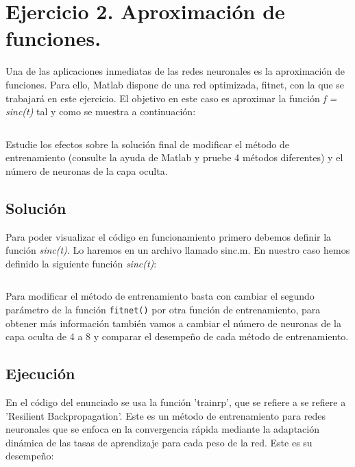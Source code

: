 \documentclass[a4paper, 12pt]{article}
\begin{document}
    
    \section{Ejercicio 2. Aproximación de funciones.}
    
        Una de las aplicaciones inmediatas de las redes neuronales es la aproximación de funciones. Para ello, Matlab dispone de una red optimizada, fitnet, con la que se trabajará en este ejercicio. El objetivo en este caso es aproximar la función \emph{f = sinc(t)} tal y como se muestra a continuación:

        \inputminted[fontsize=\scriptsize, linenos, breaklines=true, xleftmargin=0.75cm, frame=lines]{matlab}{code/parte1/Ej2.m}

        Estudie los efectos sobre la solución final de modificar el método de entrenamiento (consulte la ayuda de Matlab y pruebe 4 métodos diferentes) y el número de neuronas de la capa oculta.

        \subsection{Solución}
            Para poder visualizar el código en funcionamiento primero debemos definir la función \emph{sinc(t)}. Lo haremos en un archivo llamado sinc.m. En nuestro caso hemos definido la siguiente función \emph{sinc(t)}:

            \inputminted[fontsize=\scriptsize, linenos, breaklines=true, xleftmargin=0.75cm, frame=lines]{matlab}{code/parte1/sinc.m}

            Para modificar el método de entrenamiento basta con cambiar el segundo parámetro de la función \texttt{fitnet()} por otra función de entrenamiento, para obtener más información también vamos a cambiar el número de neuronas de la capa oculta de 4 a 8 y comparar el desempeño de cada método de entrenamiento.

            \newpage
            \subsection{Ejecución}
                En el código del enunciado se usa la función 'trainrp', que se refiere a se refiere a 'Resilient Backpropagation'. Este es un método de entrenamiento para redes neuronales que se enfoca en la convergencia rápida mediante la adaptación dinámica de las tasas de aprendizaje para cada peso de la red. Este es su desempeño:
                
\end{document}

